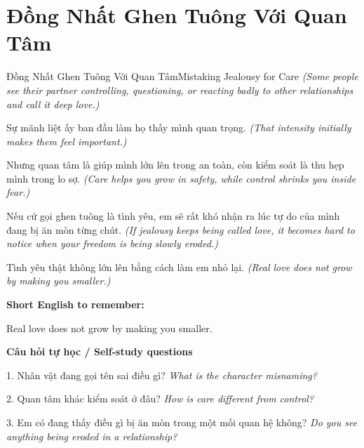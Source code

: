 \section{Đồng Nhất Ghen Tuông Với Quan Tâm}
\begin{truyen}{Đồng Nhất Ghen Tuông Với Quan Tâm}{Mistaking Jealousy for Care}
\textit{(Some people see their partner controlling, questioning, or reacting badly to other relationships and call it deep love.)}

Sự mãnh liệt ấy ban đầu làm họ thấy mình quan trọng.
\textit{(That intensity initially makes them feel important.)}

Nhưng quan tâm là giúp mình lớn lên trong an toàn, còn kiểm soát là thu hẹp mình trong lo sợ.
\textit{(Care helps you grow in safety, while control shrinks you inside fear.)}

Nếu cứ gọi ghen tuông là tình yêu, em sẽ rất khó nhận ra lúc tự do của mình đang bị ăn mòn từng chút.
\textit{(If jealousy keeps being called love, it becomes hard to notice when your freedom is being slowly eroded.)}

\end{truyen}

\begin{baihoc}
Tình yêu thật không lớn lên bằng cách làm em nhỏ lại.
\textit{(Real love does not grow by making you smaller.)}
\end{baihoc}

\begin{ghinhoanh}
\textbf{Short English to remember:}

Real love does not grow by making you smaller.

\end{ghinhoanh}

\begin{tuhocnhanh}
\textbf{Câu hỏi tự học / Self-study questions}

1. Nhân vật đang gọi tên sai điều gì? \textit{What is the character misnaming?}

2. Quan tâm khác kiểm soát ở đâu? \textit{How is care different from control?}

3. Em có đang thấy điều gì bị ăn mòn trong một mối quan hệ không? \textit{Do you see anything being eroded in a relationship?}
\end{tuhocnhanh}
\ngancach

